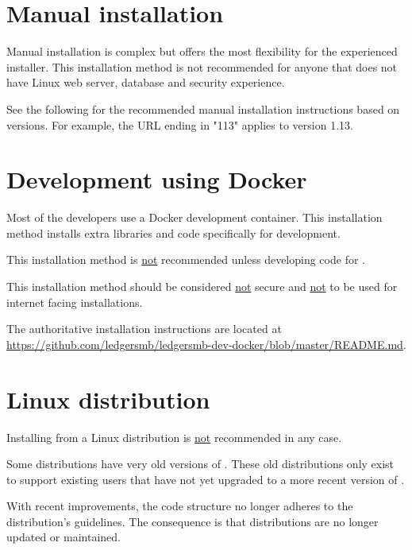\section{Manual installation}
\label{sec-installation-manual}

Manual installation is complex but offers the most flexibility for the experienced installer.  
This installation method is not recommended for anyone that does not have Linux web server, database and security experience.

See the following for the recommended manual installation instructions based on \lsmbsp versions. 
For example, the URL ending in "113" applies to \lsmbsp version 1.13.




\section{Development using Docker}
\label{sec-installation-docker-development}

Most of the developers use a Docker development container. 
This installation method installs extra libraries and code specifically for development. 

This installation method is \underline{not} recommended unless developing code for \lsmb. 

This installation method should be considered \underline{not} secure and \underline{not} to be used for internet facing installations.

The authoritative installation instructions are located at \\
\url{https://github.com/ledgersmb/ledgersmb-dev-docker/blob/master/README.md}.
    
\section{Linux distribution}
\label{sec-installation-linux-distribution}

Installing from a Linux distribution is \underline{not} recommended in any case.

Some distributions have very old versions of \lsmb. 
These old distributions only exist to support existing users that have not yet upgraded to a more recent version of \lsmb.

With recent \lsmbsp improvements, the \lsmbsp code structure no longer adheres to the distribution's guidelines.
The consequence is that \lsmbsp distributions are no longer updated or maintained.



